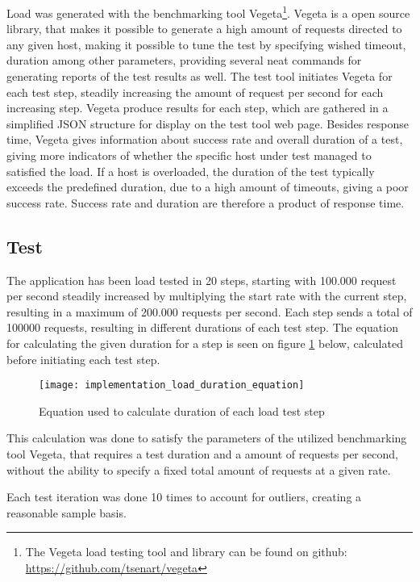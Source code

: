 Load was generated with the benchmarking tool Vegeta\footnote{The Vegeta load testing tool and library can be found on github: \url{https://github.com/tsenart/vegeta}}. Vegeta is a open source library, that makes it possible to generate a high amount of requests directed to any given host, making it possible to tune the test by specifying wished timeout, duration among other parameters, providing several neat commands for generating reports of the test results as well. The test tool initiates Vegeta for each test step, steadily increasing the amount of request per second for each increasing step. Vegeta produce results for each step, which are gathered in a simplified JSON structure for display on the test tool web page. Besides response time, Vegeta gives information about success rate and overall duration of a test, giving more indicators of whether the specific host under test managed to satisfied the load. If a host is overloaded, the duration of the test typically exceeds the predefined duration, due to a high amount of timeouts, giving a poor success rate. Success rate and duration are therefore a product of response time.

\subsection{Test}
The application has been load tested in 20 steps, starting with 100.000 request per second steadily increased by multiplying the start rate with the current step, resulting in a maximum of 200.000 requests per second. Each step sends a total of 100000 requests, resulting in different durations of each test step. The equation for calculating the given duration for a step is seen on figure \ref{fig:implementation_load_duration_equation} below, calculated before initiating each test step.

\begin{figure}[!htb]
  \texttt{[image: implementation\_load\_duration\_equation]}  
  \caption{Equation used to calculate duration of each load test step}
  \label{fig:implementation_load_duration_equation}
\end{figure}

This calculation was done to satisfy the parameters of the utilized benchmarking tool Vegeta, that requires a test duration and a amount of requests per second, without the ability to specify a fixed total amount of requests at a given rate.

Each test iteration was done 10 times to account for outliers, creating a reasonable sample basis.



